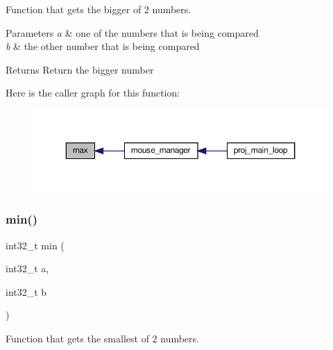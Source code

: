 Function that gets the bigger of 2 numbers. 


\begin{DoxyParams}{Parameters}
{\em a} & one of the numbers that is being compared \\
\hline
{\em b} & the other number that is being compared\\
\hline
\end{DoxyParams}
\begin{DoxyReturn}{Returns}
Return the bigger number 
\end{DoxyReturn}
Here is the caller graph for this function\+:
\nopagebreak
\begin{figure}[H]
\begin{center}
\leavevmode
\includegraphics[width=350pt]{group__myutils_gad2cb7db3e303727f643020a668377947_icgraph}
\end{center}
\end{figure}
\mbox{\label{group__myutils_ga86fabf639ab773666d2c7936b104a668}} 
\subsubsection{\texorpdfstring{min()}{min()}}
{\footnotesize\ttfamily int32\+\_\+t min (\begin{DoxyParamCaption}\item[{int32\+\_\+t}]{a,  }\item[{int32\+\_\+t}]{b }\end{DoxyParamCaption})}



Function that gets the smallest of 2 numbers. 


